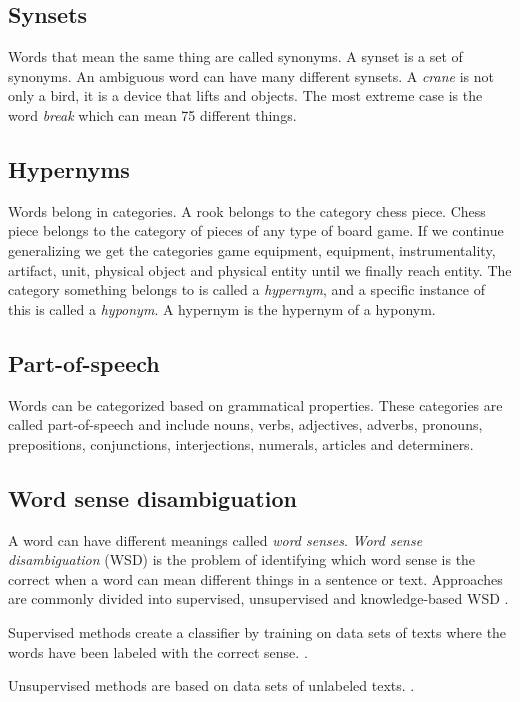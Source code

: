 \subsection{Synsets}
Words that mean the same thing are called synonyms. A synset is a set of synonyms. An ambiguous word can have many different synsets. A \emph{crane} is not only a bird, it is a device that lifts and objects. The most extreme case is the word \emph{break} which can mean 75 different things.

\subsection{Hypernyms}
Words belong in categories. A rook belongs to the category chess piece. Chess piece belongs to the category of pieces of any type of board game. If we continue generalizing we get the categories game equipment, equipment, instrumentality, artifact, unit, physical object and physical entity until we finally reach entity. The category something belongs to is called a \emph{hypernym}, and a specific instance of this is called a \emph{hyponym}. A hypernym is the hypernym of a hyponym.

\subsection{Part-of-speech}
Words can be categorized based on grammatical properties. These categories are called part-of-speech and include nouns, verbs, adjectives, adverbs, pronouns, prepositions, conjunctions, interjections, numerals, articles and determiners.

\subsection{Word sense disambiguation}
A word can have different meanings called \emph{word senses}. \emph{Word sense disambiguation} (WSD) is the problem of identifying which word sense is the correct when a word can mean different things in a sentence or text. Approaches are commonly divided into supervised, unsupervised and knowledge-based WSD \parencite{navigli2009word}.

Supervised methods create a classifier by training on data sets of texts where the words have been labeled with the correct sense. \parencite{navigli2009word}.

Unsupervised methods are based on data sets of unlabeled texts. \parencite{navigli2009word}. %
